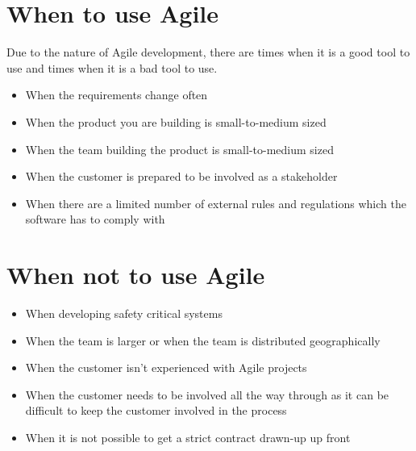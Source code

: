 \section{When to use Agile}
Due to the nature of Agile development, there are times when it is a good tool to use and times when it is a bad tool to use.
\begin{itemize}
    \item When the requirements change often
    \item When the product you are building is small-to-medium sized
    \item When the team building the product is small-to-medium sized
    \item When the customer is prepared to be involved as a stakeholder
    \item When there are a limited number of external rules and regulations which the software has to comply with
\end{itemize}

\section{When not to use Agile}
\begin{itemize}
    \item When developing safety critical systems
    \item When the team is larger or when the team is distributed geographically
    \item When the customer isn't experienced with Agile projects
    \item When the customer needs to be involved all the way through as it can be difficult to keep the customer involved in the process
    \item When it is not possible to get a strict contract drawn-up up front
\end{itemize}